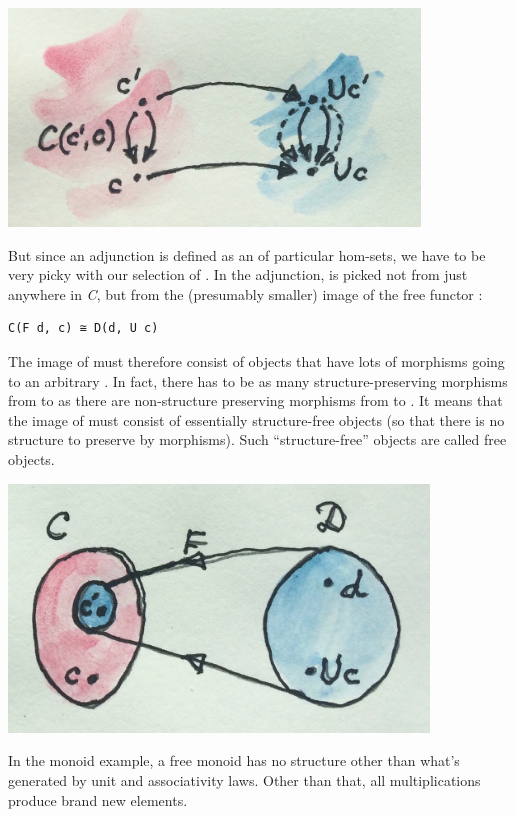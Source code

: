 \includegraphics[width=4.30208in]{images/forgettingmorphisms.jpg}

But since an adjunction is defined as an  of
particular hom-sets, we have to be very picky with our selection of
. In the adjunction,  is picked not
from just anywhere in \emph{C}, but from the (presumably smaller) image
of the free functor :

\begin{verbatim}
C(F d, c) ≅ D(d, U c)
\end{verbatim}

The image of  must therefore consist of objects that have lots
of morphisms going to an arbitrary . In fact, there has to be
as many structure-preserving morphisms from  to 
as there are non-structure preserving morphisms from  to
. It means that the image of  must consist of
essentially structure-free objects (so that there is no structure to
preserve by morphisms). Such ``structure-free'' objects are called free
objects.

\includegraphics[width=4.39583in]{images/freeimage.jpg}

In the monoid example, a free monoid has no structure other than what's
generated by unit and associativity laws. Other than that, all
multiplications produce brand new elements.

